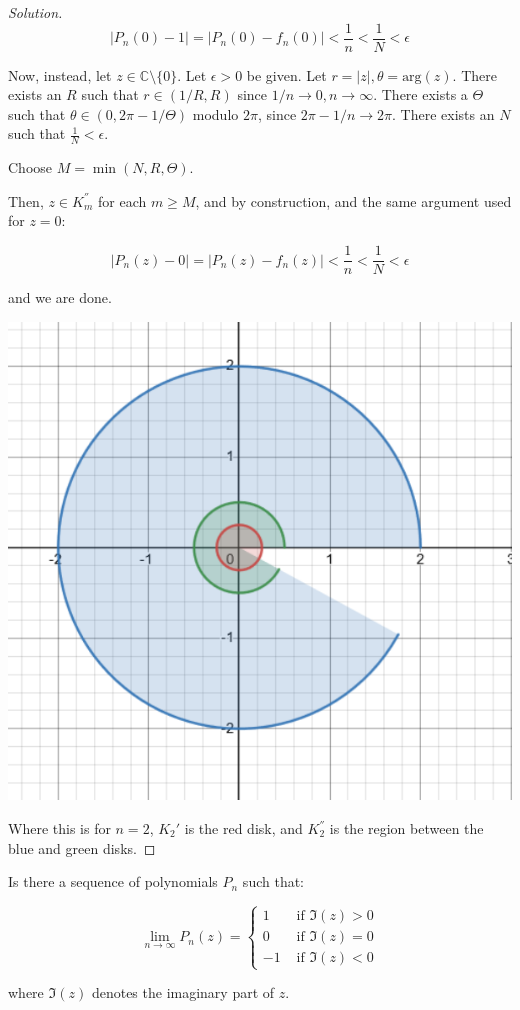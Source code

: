 \documentclass[10pt]{article}
\newenvironment{problem}[2][]{\begin{trivlist}
\item[\hskip \labelsep {\bfseries #1}\hskip \labelsep {\bfseries #2.}]}{\end{trivlist}}
\begin{document}
\begin{proof}[Solution]
$$| P_n(0) - 1 | = | P_n(0) - f_n(0) | < \frac{1}{n} < \frac{1}{N} < \epsilon$$

Now, instead, let $z \in \mathbb{C} \setminus \{ 0 \}$. Let $\epsilon > 0$ be given. Let $r = |z|, \theta = \text{arg}(z)$. There exists an $R$ such that $r \in (1/R, R)$ since $1/n \to 0, n \to \infty$. There exists a $\Theta$ such that $\theta \in (0,2\pi - 1/\Theta)$ modulo $2\pi$, since $2\pi - 1/n \to 2\pi$. There exists an $N$ such that $\frac{1}{N} < \epsilon$.

Choose $M = \min(N, R, \Theta)$.

Then, $z \in K_m^{''}$ for each $m \geq M$, and by construction, and the same argument used for $z = 0$:

$$ | P_n(z) - 0 | =  | P_n(z) - f_n(z) | < \frac{1}{n} < \frac{1}{N} < \epsilon$$

and we are done.

\begin{center}
\includegraphics[width=\linewidth]{partial_annulus}
\end{center}

Where this is for $n=2$, $K_2'$ is the red disk, and $K_2^{''}$ is the region between the blue and green disks.

\end{proof}

\begin{problem}{Question 4}

Is there a sequence of polynomials $P_n$ such that:

$$\lim_{n\to\infty} P_n(z) = \begin{cases} 1 & \text{  if } \Im(z) > 0 \\ 0 &  \text{  if } \Im(z) = 0  \\ -1 & \text{  if } \Im(z) < 0 \end{cases} $$ 

where $\Im(z)$ denotes the imaginary part of $z$.

\end{problem}
 
\end{document}
